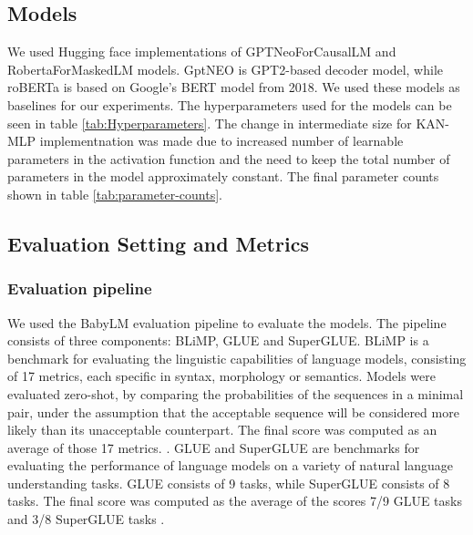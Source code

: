 \subsection{Models}
We used Hugging face implementations of GPTNeoForCausalLM \cite{huggingfaceNEO} and RobertaForMaskedLM \cite{huggingfaceRoberta} models. GptNEO is GPT2-based decoder model, while roBERTa is based on Google's BERT model from 2018. We used these models as baselines for our experiments. The hyperparameters used for the models can be seen in table \ref{tab:Hyperparameters}. The change in intermediate size for KAN-MLP implementnation was made due to increased number of learnable parameters in the activation function and the need to keep the total number of parameters in the model approximately constant. The final parameter counts shown in table \ref{tab:parameter-counts}.

\subsection{Evaluation Setting and Metrics}
\subsubsection{Evaluation pipeline}
We used the BabyLM evaluation pipeline \cite{Warstadt2023} to evaluate the models. The pipeline consists of three components: BLiMP, GLUE and SuperGLUE. BLiMP is a benchmark for evaluating the linguistic capabilities of language models, consisting of 17 metrics, each specific in syntax, morphology or semantics. Models were evaluated zero-shot, by comparing the probabilities of the sequences in a minimal pair, under the assumption that the acceptable sequence will be considered more likely than its unacceptable counterpart. The final score was computed as an average of those 17 metrics. \cite{Warstadt2023blimp} \cite{warstadt-etal-2023-findings}.  GLUE and SuperGLUE are benchmarks for evaluating the performance of language models on a variety of natural language understanding tasks. GLUE consists of 9 tasks, while SuperGLUE consists of 8 tasks. The final score was computed as the average of the scores 7/9 GLUE tasks and 3/8 SuperGLUE tasks \cite{Wang2019} \cite{Wang2020}.

